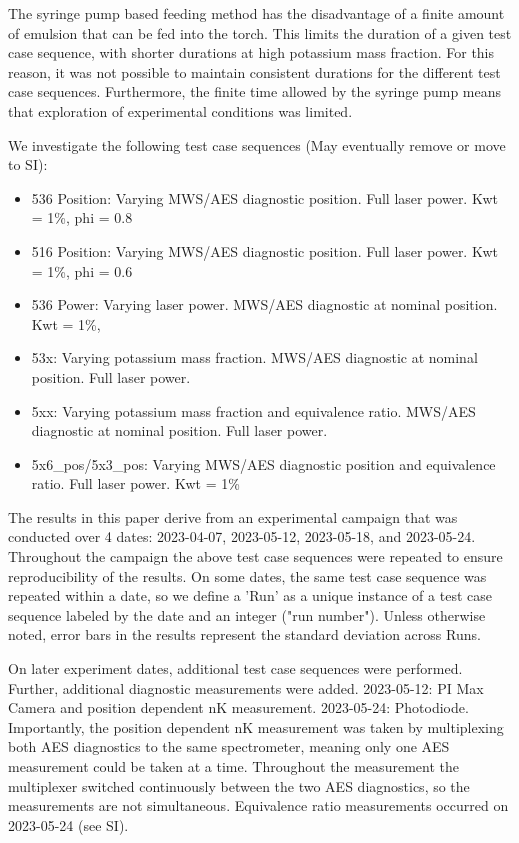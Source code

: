 The syringe pump based feeding method has the disadvantage of a finite amount of emulsion that can be fed into the torch. This limits the duration of a given test case sequence, with shorter durations at high potassium mass fraction. For this reason, it was not possible to maintain consistent durations for the different test case sequences. Furthermore, the finite time allowed by the syringe pump means that exploration of experimental conditions was limited. 

We investigate the following test case sequences (May eventually remove or move to SI):
\begin{itemize}
    \item 536 Position: Varying MWS/AES diagnostic position. Full laser power. Kwt = 1\%, phi = 0.8
    \item 516 Position: Varying MWS/AES diagnostic position. Full laser power. Kwt = 1\%, phi = 0.6
    \item 536 Power: Varying laser power. MWS/AES diagnostic at nominal position. Kwt = 1\%, 
    \item 53x: Varying potassium mass fraction. MWS/AES diagnostic at nominal position. Full laser power.
    \item 5xx: Varying potassium mass fraction and equivalence ratio. MWS/AES diagnostic at nominal position. Full laser power.
    \item 5x6\_pos/5x3\_pos: Varying MWS/AES diagnostic position and equivalence ratio. Full laser power. Kwt = 1\%
\end{itemize}

The results in this paper derive from an experimental campaign that was conducted over 4 dates: 2023-04-07, 2023-05-12, 2023-05-18, and 2023-05-24. Throughout the campaign the above test case sequences were repeated to ensure reproducibility of the results. On some dates, the same test case sequence was repeated within a date, so we define a 'Run' as a unique instance of a test case sequence labeled by the date and an integer ("run number").  Unless otherwise noted, error bars in the results represent the standard deviation across Runs. 

On later experiment dates, additional test case sequences were performed. Further, additional diagnostic measurements were added. 2023-05-12: PI Max Camera and position dependent nK measurement. 2023-05-24: Photodiode. Importantly, the position dependent nK measurement was taken by multiplexing both AES diagnostics to the same spectrometer, meaning only one AES measurement could be taken at a time. Throughout the measurement the multiplexer switched continuously between the two AES diagnostics, so the measurements are not simultaneous. Equivalence ratio measurements occurred on 2023-05-24 (see SI). 

